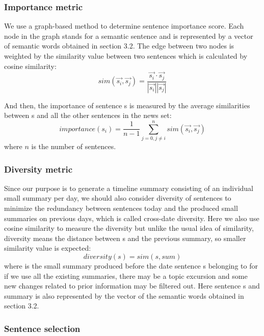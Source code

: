 \documentclass[runningheads,a4paper]{llncs}
\begin{document}
\subsubsection{Importance metric}
We use a graph-based method to determine sentence importance score. Each node in the graph stands for a semantic sentence and is represented by a vector of semantic words obtained in section 3.2. The edge between two nodes is weighted by the similarity value between two sentences which is calculated by cosine similarity:
\begin{equation}
sim(\overrightarrow{s_i}, \overrightarrow{s_j}) = \frac{\overrightarrow{s_i} \cdot \overrightarrow{s_j} } {| \overrightarrow{s_i} || \overrightarrow{s_j} |}
\end{equation}

And then, the importance of sentence s is measured by the average similarities between s and all the other sentences in the news set:
\begin{equation}
importance(s_i) = \frac{1}{n-1} \sum_{j=0, j \neq i}^n sim(\overrightarrow{s_i}, \overrightarrow{s_j})
\end{equation}
where $n$ is the number of sentences.

\subsubsection{Diversity metric}
Since our purpose is to generate a timeline summary consisting of an individual small summary per day, we should also consider diversity of sentences to minimize the redundancy between sentences today and the produced small summaries on previous days, which is called cross-date diversity. Here we also use cosine similarity to measure the diversity but unlike the usual idea of similarity, diversity means the distance between s and the previous summary, so smaller similarity value is expected:
\begin{equation}
diversity(s) = sim(s, sum)
\end{equation}
where   is the small summary produced before the date sentence s belonging to for if we use all the existing summaries, there may be a topic excursion and some new changes related to prior information may be filtered out. Here sentence s and summary is also represented by the vector of the semantic words obtained in section 3.2.

\subsubsection{Sentence selection}
\end{document}
